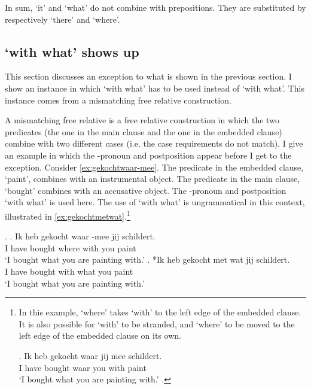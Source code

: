 \documentclass[12pt]{article}
\begin{document}
In sum,  `it' and  `what' do not combine with prepositions. They are substituted by respectively  `there' and  `where'.


\subsection{ `with what' shows up}

This section discusses an exception to what is shown in the previous section. I show an instance in which  `with what' has to be used instead of  `with what'. This instance comes from a mismatching free relative construction.

A mismatching free relative is a free relative construction in which the two predicates (the one in the main clause and the one in the embedded clause) combine with two different cases (i.e. the case requirements do not match). I give an example in which the -pronoun and postposition appear before I get to the exception. Consider \ref{ex:gekochtwaar-mee}. The predicate in the embedded clause,  `paint', combines with an instrumental object. The predicate in the main clause,  `bought' combines with an accusative object. The -pronoun and postposition  `with what' is used here. The use of  `with what' is ungrammatical in this context, illustrated in \ref{ex:gekochtmetwat}.\footnote{In this example,  `where' takes  `with' to the left edge of the embedded clause. It is also possible for  `with' to be stranded, and  `where' to be moved to the left edge of the embedded clause on its own.

\exg. Ik heb gekocht waar jij mee schildert.\\
 I have bought waar you with paint\\
 `I bought what you are painting with.'\label{ex:meealong}
\z.

\phantom{x}
}

\ex.
\ag. Ik heb gekocht waar -mee jij schildert.\\
 I have bought where with you paint\\
 `I bought what you are painting with.'\label{ex:gekochtwaar-mee}
\bg. *Ik heb gekocht met wat jij schildert.\\
 I have bought with what you paint\\
 `I bought what you are painting with.'\label{ex:gekochtmetwat}
\end{document}
